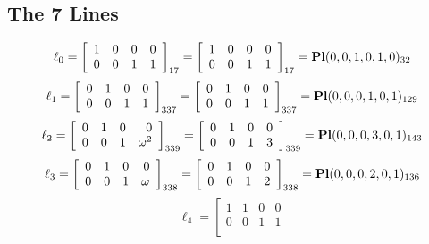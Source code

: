 \documentclass{article}
\begin{document}
{\subsection*{The 7 Lines}
$$
\ell_{0} = 
\left[
\begin{array}{*{4}{r}}
1 & 0 & 0 & 0\\
0 & 0 & 1 & 1\\
\end{array}
\right]
_{17}
=
\left[
\begin{array}{*{4}c}
1  & 0  & 0  & 0\\
0  & 0  & 1  & 1\\
\end{array}
\right]_{17}
={\rm\bf Pl}(0,0,1,0,1,0 )_{32}$$
$$
\ell_{1} = 
\left[
\begin{array}{*{4}{r}}
0 & 1 & 0 & 0\\
0 & 0 & 1 & 1\\
\end{array}
\right]
_{337}
=
\left[
\begin{array}{*{4}c}
0  & 1  & 0  & 0\\
0  & 0  & 1  & 1\\
\end{array}
\right]_{337}
={\rm\bf Pl}(0,0,0,1,0,1 )_{129}$$
$$
\ell_{2} = 
\left[
\begin{array}{*{4}{r}}
0 & 1 & 0 & 0\\
0 & 0 & 1 & \omega^{2}\\
\end{array}
\right]
_{339}
=
\left[
\begin{array}{*{4}c}
0  & 1  & 0  & 0\\
0  & 0  & 1  & 3\\
\end{array}
\right]_{339}
={\rm\bf Pl}(0,0,0,3,0,1 )_{143}$$
$$
\ell_{3} = 
\left[
\begin{array}{*{4}{r}}
0 & 1 & 0 & 0\\
0 & 0 & 1 & \omega \\
\end{array}
\right]
_{338}
=
\left[
\begin{array}{*{4}c}
0  & 1  & 0  & 0\\
0  & 0  & 1  & 2\\
\end{array}
\right]_{338}
={\rm\bf Pl}(0,0,0,2,0,1 )_{136}$$
$$
\ell_{4} = 
\left[
\begin{array}{*{4}{r}}
1 & 1 & 0 & 0\\
0 & 0 & 1 & 1\\

\end{array}$$}
\end{document}
